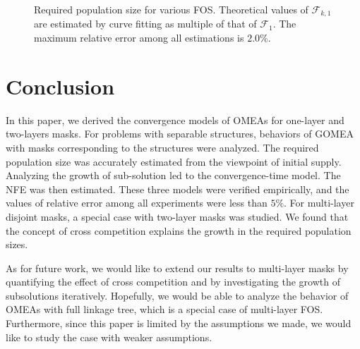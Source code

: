\documentclass{sig-alternate}
\begin{document}
\begin{figure}%
\centering
{}
\caption{Required population size for various FOS.
Theoretical values of ${\mathcal F}_{k,1}$
are estimated by curve fitting as multiple of that of ${\mathcal F}_1$.
The maximum relative error among all estimations is $2.0\%$.
}
\label{fig:pop_k1}
\end{figure}




\section{Conclusion}
\label{sec:conclusion}

In this paper, we derived the convergence models of OMEAs
for one-layer and two-layers masks.
For problems with separable structures,
behaviors of GOMEA with masks corresponding to the structures were analyzed.
The required population size was accurately estimated from the viewpoint of initial supply.
Analyzing the growth of sub-solution led to the convergence-time model.
The NFE was then estimated.
These three models were verified empirically,
and the values of relative error among all experiments were less than $5\%$.
For multi-layer disjoint masks, a special case with two-layer masks was studied.
We found that the concept of cross competition explains the growth in the required population sizes.

As for future work, we would like to extend our results to multi-layer masks by quantifying the effect of cross competition and by investigating the growth of subsolutions iteratively.
Hopefully, we would be able to analyze the behavior of OMEAs with full linkage tree,
which is a special case of multi-layer FOS.
Furthermore, since this paper is limited by the assumptions we made, we would like to study the case with weaker assumptions.
\end{document}
